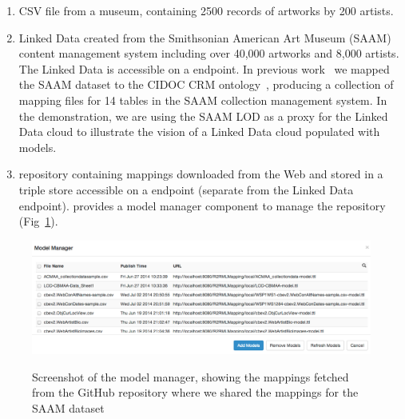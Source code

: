 \begin{enumerate}
\item CSV file from a museum, containing 2500 records of artworks by 200  artists.

\item Linked Data created from the Smithsonian American Art Museum (SAAM) content management system including over 40,000 artworks and 8,000 artists. 
The Linked Data is accessible on a \sparql endpoint.
In previous work~ we mapped the SAAM dataset to the CIDOC CRM ontology~\cite{Doerr:2003:CCR:958671.958678}, producing a collection of \rtworml mapping files for 14 tables in the SAAM collection management system.
In the demonstration, we are using the SAAM LOD as a proxy for the Linked Data cloud to illustrate the vision of a Linked Data cloud populated with \rtworml models.

\item \rtworml repository containing \rtworml mappings downloaded from the Web and stored in a triple store accessible on a \sparql endpoint (separate from the Linked Data endpoint).
\karma provides a model manager component to manage the \rtworml repository (Fig~\ref{fig:model-manager-screenshot}).
\end{enumerate}
%

\begin{figure}[bth]
\begin{center}
\includegraphics[width=4.8in]{images/3-model-manager.png}
\vspace{-3mm}
\caption{Screenshot of the model manager, showing the \rtworml mappings fetched from the GitHub repository where we shared the mappings for the SAAM dataset }
\vspace{-2mm}
\label{fig:model-manager-screenshot}
\end{center}
\vspace{-1.5em}
\end{figure}